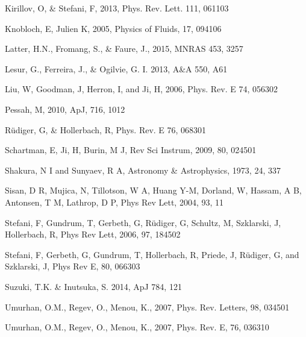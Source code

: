 \documentclass{emulateapj}
\begin{document}
\begin{thebibliography}{53}
Kirillov, O, \& Stefani, F, 2013, Phys. Rev. Lett. 111, 061103

Knobloch, E, Julien K, 2005, Physics of Fluids, 17, 094106

Latter, H.N., Fromang, S., \& Faure, J., 2015, MNRAS 453, 3257

Lesur, G., Ferreira, J., \& Ogilvie, G. I. 2013, A\&A 550, A61

Liu, W, Goodman, J, Herron, I, and Ji, H, 2006, Phys. Rev. E 74, 056302

Pessah, M, 2010, ApJ, 716, 1012

R\"udiger, G, \& Hollerbach, R, Phys. Rev. E 76, 068301

Schartman, E, Ji, H, Burin, M J, Rev Sci Instrum, 2009, 80, 024501

Shakura, N I and Sunyaev, R A, Astronomy \& Astrophysics, 1973, 24, 337

Sisan, D R, Mujica, N, Tillotson, W A, Huang Y-M, Dorland, W, Hassam, A B, Antonsen, T M, Lathrop, D P, Phys Rev Lett, 2004, 93, 11

Stefani, F, Gundrum, T, Gerbeth, G, R\"udiger, G, Schultz, M, Szklarski, J, Hollerbach, R, Phys Rev Lett, 2006, 97, 184502

Stefani, F, Gerbeth, G, Gundrum, T, Hollerbach, R, Priede, J, R\"udiger, G, and Szklarski, J, Phys Rev E, 80, 066303

Suzuki, T.K. \& Inutsuka, S. 2014, ApJ 784, 121

Umurhan, O.M., Regev, O., Menou, K., 2007, Phys. Rev. Letters, 98, 034501

Umurhan, O.M., Regev, O., Menou, K., 2007, Phys. Rev. E, 76, 036310


\end{thebibliography}
\end{document}
